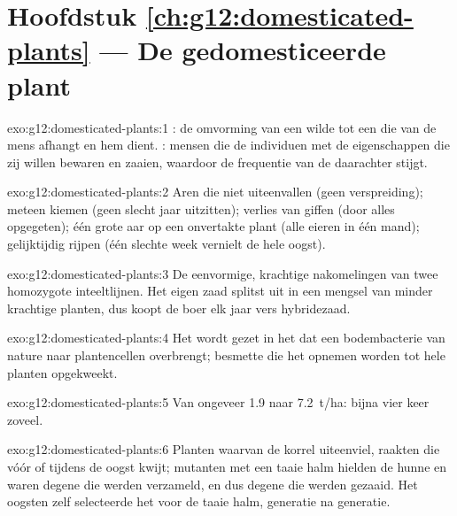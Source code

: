 \section*{Hoofdstuk \ref{ch:g12:domesticated-plants} --- De gedomesticeerde plant}

\begin{solution}{exo:g12:domesticated-plants:1}
: de omvorming van een wilde  tot een  die van de
mens afhangt en hem dient. : mensen die de individuen
met de eigenschappen die zij willen bewaren en zaaien, waardoor de
frequentie van de  daarachter stijgt.
\end{solution}

\begin{solution}{exo:g12:domesticated-plants:2}
Aren die niet uiteenvallen (geen verspreiding); meteen kiemen (geen slecht
jaar uitzitten); verlies van giffen (door alles opgegeten); één grote aar
op een onvertakte plant (alle eieren in één mand); gelijktijdig rijpen
(één slechte week vernielt de hele oogst).
\end{solution}

\begin{solution}{exo:g12:domesticated-plants:3}
De eenvormige, krachtige nakomelingen van twee homozygote inteeltlijnen.
Het eigen zaad splitst uit in een mengsel van minder krachtige planten,
dus koopt de boer elk jaar vers hybridezaad.
\end{solution}

\begin{solution}{exo:g12:domesticated-plants:4}
Het  wordt gezet in het  dat een bodembacterie van nature naar
plantencellen overbrengt; besmette  die het  opnemen worden tot
hele planten opgekweekt.
\end{solution}

\begin{solution}{exo:g12:domesticated-plants:5}
Van ongeveer \num{1.9} naar \qty{7.2}{t/ha}: bijna vier keer zoveel.
\end{solution}

\begin{solution}{exo:g12:domesticated-plants:6}
Planten waarvan de korrel uiteenviel, raakten die vóór of tijdens de oogst
kwijt; mutanten met een taaie halm hielden de hunne en waren degene die
werden verzameld, en dus degene die werden gezaaid. Het oogsten zelf
selecteerde het  voor de taaie halm, generatie na generatie.
\end{solution}

